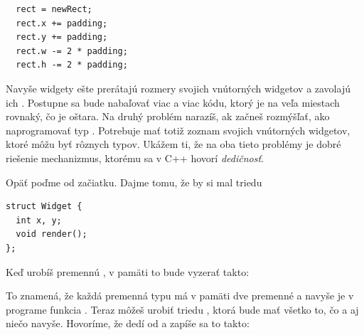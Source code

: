 \begin{lstlisting}
  rect = newRect;
  rect.x += padding;
  rect.y += padding;
  rect.w -= 2 * padding;
  rect.h -= 2 * padding;
\end{lstlisting}

Navyše widgety  ešte prerátajú rozmery svojich vnútorných widgetov a zavolajú
ich . Postupne sa bude nabaľovať viac a viac kódu, ktorý je na veľa miestach rovnaký,
čo je oštara. Na druhý problém narazíš, ak začneš rozmýšľať, ako naprogramovať typ .
Potrebuje mať totiž zoznam svojich vnútorných widgetov, ktoré môžu byť rôznych typov. 
Ukážem ti, že na oba tieto problémy je dobré riešenie mechanizmus, ktorému sa v C++
hovorí {\em dedičnosť}.

Opäť poďme od začiatku. Dajme tomu, že by si mal triedu

\begin{lstlisting}
struct Widget {
  int x, y;
  void render();
};
\end{lstlisting}

Keď urobíš premennú , v pamäti to bude vyzerať takto:


To znamená, že každá premenná typu  má v pamäti dve premenné 
a navyše je v programe funkcia .
Teraz môžeš urobiť triedu , ktorá bude mať všetko to, čo 
a aj niečo navyše. Hovoríme, že  dedí od  a zapíše sa to takto:

